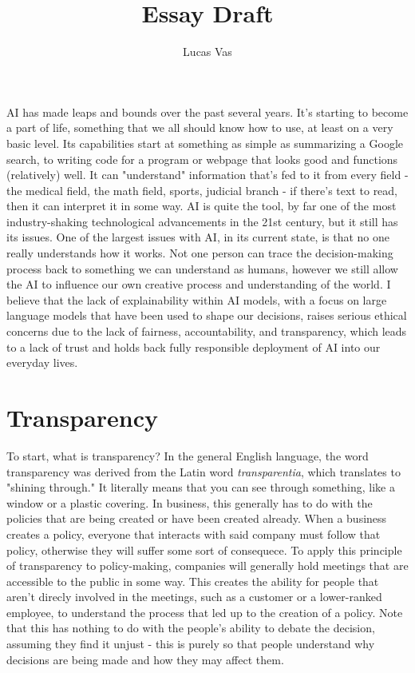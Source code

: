 \documentclass[12pt]{article}
\title{Essay Draft}
\author{Lucas Vas}
\date{}
\begin{document}
    
    \thispagestyle{firstPage}
    \maketitle
    
    AI has made leaps and bounds over the past several years. It's starting to become a part of
    life, something that we all should know how to use, at least on a very basic level. Its
    capabilities start at something as simple as summarizing a Google search, to writing code
    for a program or webpage that looks good and functions (relatively) well. It can "understand"
    information that's fed to it from every field - the medical field, the math field, sports, 
    judicial branch - if there's text to read, then it can interpret it in some way. AI is quite
    the tool, by far one of the most industry-shaking technological advancements in the 21st century,
    but it still has its issues. One of the largest issues with AI, in its current state, is that
    no one really understands how it works. Not one person can trace the decision-making process
    back to something we can understand as humans, however we still allow the AI to influence our
    own creative process and understanding of the world. I believe that the lack of explainability
    within AI models, with a focus on large language models that have been used to shape our
    decisions, raises serious ethical concerns due to the lack of fairness, accountability, and 
    transparency, which leads to a lack of trust and holds back fully responsible deployment of AI
    into our everyday lives.

    \section{Transparency}
    To start, what is transparency? In the general English language, the word transparency was 
    derived from the Latin word \textit{transparentia}, which translates to "shining through."
    It literally means that you can see through something, like a window or a plastic covering.
    In business, this generally has to do with the policies that are being created or have been
    created already. When a business creates a policy, everyone that interacts with said company
    must follow that policy, otherwise they will suffer some sort of consequece. To apply this
    principle of transparency to policy-making, companies will generally hold meetings that are
    accessible to the public in some way. This creates the ability for people that aren't direcly
    involved in the meetings, such as a customer or a lower-ranked employee, to understand the
    process that led up to the creation of a policy. Note that this has nothing to do with the
    people's ability to debate the decision, assuming they find it unjust - this is purely so 
    that people understand why decisions are being made and how they may affect them.
\end{document}
